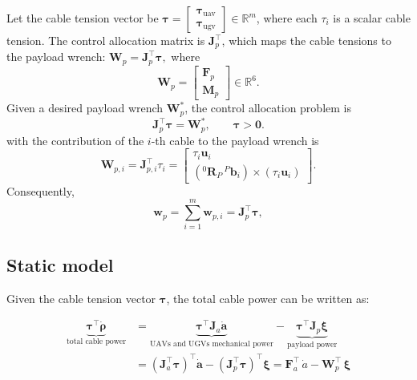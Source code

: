\noindent Let the cable tension vector be $\boldsymbol{\tau}
    =
    \begin{bmatrix}
        \boldsymbol{\tau}_{\mathrm{uav}} \\
        \boldsymbol{\tau}_{\mathrm{ugv}}
    \end{bmatrix}
    \in\mathbb{R}^{m}$, where each $\tau_i$ is a scalar cable tension. The control allocation matrix is $\mathbf{J}_p^\top$, which maps the cable
tensions to the payload wrench: $ \mathbf{W}_p = \mathbf{J}_p^\top\boldsymbol{\tau}, $
where
\begin{equation}
    \mathbf{W}_p
    =
    \begin{bmatrix}
        \mathbf{F}_p \\
        \mathbf{M}_p
    \end{bmatrix}
    \in\mathbb{R}^{6}.
\end{equation}
Given a desired payload wrench $\mathbf{W}_p^*$, the control allocation
problem is
\begin{equation}
    \mathbf{J}_p^\top\boldsymbol{\tau}
    =
    \mathbf{W}_p^*,
    \qquad
    \boldsymbol{\tau}>\mathbf{0}.
\end{equation}
with the contribution of the $i$-th cable to the payload wrench is
\begin{equation}
    \mathbf{W}_{p,i}
    =
    \mathbf{J}_{p,i}^\top\tau_i
    =
    \begin{bmatrix}
        \tau_i\mathbf{u}_i
        \\
        \left(
            {}^0\mathbf{R}_P\,{}^P\mathbf{b}_i
        \right)
        \times
        \left(
            \tau_i\mathbf{u}_i
        \right)
    \end{bmatrix}.
\end{equation}
Consequently,
\begin{equation}
    \mathbf{w}_p
    =
    \sum_{i=1}^{m}\mathbf{w}_{p,i}
    =
    \mathbf{J}_p^\top\boldsymbol{\tau},
\end{equation}


\subsection{Static model}

Given the cable tension vector $\boldsymbol{\tau}$, the total cable power can be written as:

\begin{equation} 
\begin{aligned}
    \underbrace{\boldsymbol{\tau}^{\top}\dot{\boldsymbol{\rho}}}_{\text{total cable power}} &= \underbrace{\boldsymbol{\tau}^{\top}
    \mathbf{J}_a\dot{\mathbf{a}}}_{\text{UAVs and UGVs mechanical power}} - \underbrace{\boldsymbol{\tau}^{\top}
    \mathbf{J}_p\boldsymbol{\xi}}_{\text{payload power}} \\
    &=
    \left(
        \mathbf{J}_a^\top\boldsymbol{\tau}
    \right)^\top
    \dot{\mathbf{a}}
    -
    \left(
        \mathbf{J}_p^\top\boldsymbol{\tau}
    \right)^\top
    \boldsymbol{\xi} = \mathbf{F}_a^\top \, \dot{a} - \mathbf{W}_p^\top \, \boldsymbol{\xi}
\end{aligned}
\end{equation}

